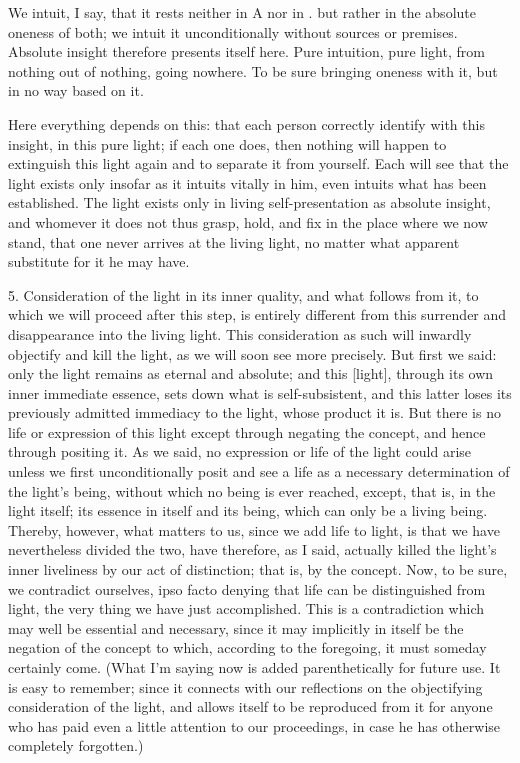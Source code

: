 We intuit, I say, that it rests neither in A nor in .
but rather in the absolute oneness of both;
we intuit it unconditionally without sources or premises.
Absolute insight therefore presents itself here.
Pure intuition, pure light,
from nothing out of nothing, going nowhere.
To be sure bringing oneness with it,
but in no way based on it.

Here everything depends on this:
that each person correctly identify
with this insight, in this pure light;
if each one does, then nothing will happen
to extinguish this light again
and to separate it from yourself.
Each will see that the light exists only
insofar as it intuits vitally in him,
even intuits what has been established.
The light exists only in living
self-presentation as absolute insight,
and whomever it does not thus grasp,
hold, and fix in the place where we now stand,
that one never arrives at the living light,
no matter what apparent substitute for it he may have.

5. Consideration of the light in its inner quality,
and what follows from it,
to which we will proceed after this step,
is entirely different from this
surrender and disappearance into the living light.
This consideration as such will inwardly
objectify and kill the light,
as we will soon see more precisely.
But first we said:
only the light remains as eternal and absolute;
and this [light], through its own inner immediate essence,
sets down what is self-subsistent,
and this latter loses its previously admitted
immediacy to the light, whose product it is.
But there is no life or expression of this light
except through negating the concept, and hence through positing it.
As we said, no expression or life of the light could arise
unless we first unconditionally posit and see a life as
a necessary determination of the light's being,
without which no being is ever reached, except,
that is, in the light itself;
its essence in itself and its being,
which can only be a living being.
Thereby, however, what matters to us,
since we add life to light, is
that we have nevertheless divided the two,
have therefore, as I said, actually killed
the light's inner liveliness
by our act of distinction;
that is, by the concept.
Now, to be sure, we contradict ourselves,
ipso facto denying that life can be distinguished from light,
the very thing we have just accomplished.
This is a contradiction which may well be essential and necessary,
since it may implicitly in itself be the negation of
the concept to which, according to the foregoing,
it must someday certainly come.
(What I'm saying now is added parenthetically for future use.
It is easy to remember;
since it connects with our reflections on
the objectifying consideration of the light,
and allows itself to be reproduced from it
for anyone who has paid even a little attention
to our proceedings, in case he has otherwise completely forgotten.)

